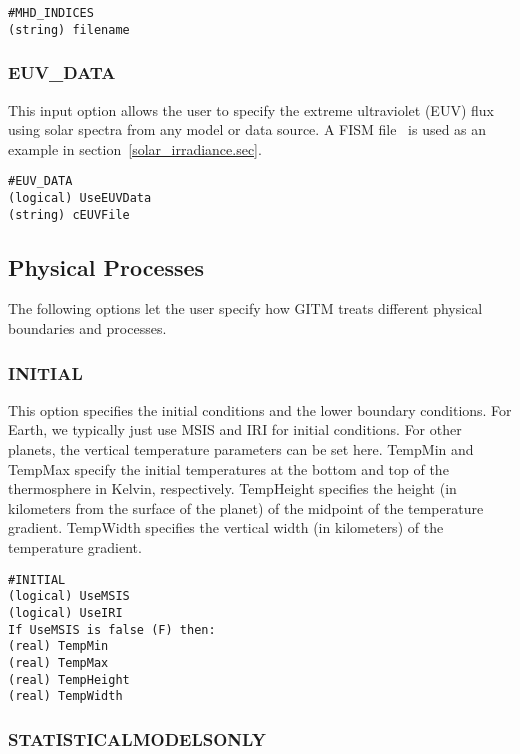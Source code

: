 \begin{verbatim}
#MHD_INDICES
(string) filename
\end{verbatim}

\subsubsection{EUV\_DATA}
\label{euv.sec}

This input option allows the user to specify the extreme ultraviolet (EUV) flux using solar spectra from any model or data source.  A FISM file~\citep{fism:2007d, fism:2008f} is used as an example in section~\ref{solar_irradiance.sec}.

\begin{verbatim}
#EUV_DATA
(logical) UseEUVData   
(string) cEUVFile     
\end{verbatim}


\subsection{Physical Processes}
\label{physics.sec}

The following options let the user specify how GITM treats different physical boundaries and processes.

\subsubsection{INITIAL}
\label{initial.sec}

This option specifies the initial conditions and the lower boundary conditions.  For Earth, we typically just use MSIS and IRI for initial conditions.  For other planets, the vertical temperature parameters can be set here.  TempMin and TempMax specify the initial temperatures at the bottom and top of the thermosphere in Kelvin, respectively.  TempHeight specifies the height (in kilometers from the surface of the planet) of the midpoint of the temperature gradient.  TempWidth specifies the vertical width (in kilometers) of the temperature gradient. 

\begin{verbatim}
#INITIAL
(logical) UseMSIS
(logical) UseIRI 
If UseMSIS is false (F) then:
(real) TempMin      
(real) TempMax        
(real) TempHeight     
(real) TempWidth     
\end{verbatim}

\subsubsection{STATISTICALMODELSONLY}
\label{statisticalmodelsonly.sec}

